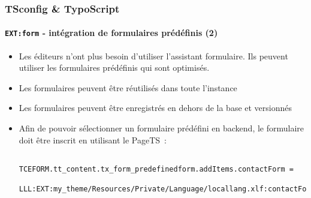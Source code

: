 \begin{frame}[fragile]
	\frametitle{TSconfig \& TypoScript}
	\framesubtitle{\texttt{EXT:form} - intégration de formulaires prédéfinis (2)}

	\lstset{basicstyle=\tiny\ttfamily}

	\begin{itemize}

		\item Les éditeurs n'ont plus besoin d'utiliser l'assistant formulaire.
			Ils peuvent utiliser les formulaires prédéfinis qui sont optimisés.

		\item Les formulaires peuvent être réutilisés dans toute l'instance

		\item Les formulaires peuvent être enregistrés en dehors de la base et versionnés

		\item Afin de pouvoir sélectionner un formulaire prédéfini en backend,
			le formulaire doit être inscrit en utilisant le PageTS~:

		\begin{lstlisting}
			TCEFORM.tt_content.tx_form_predefinedform.addItems.contactForm =
			  LLL:EXT:my_theme/Resources/Private/Language/locallang.xlf:contactForm
		\end{lstlisting}

	\end{itemize}

\end{frame}

